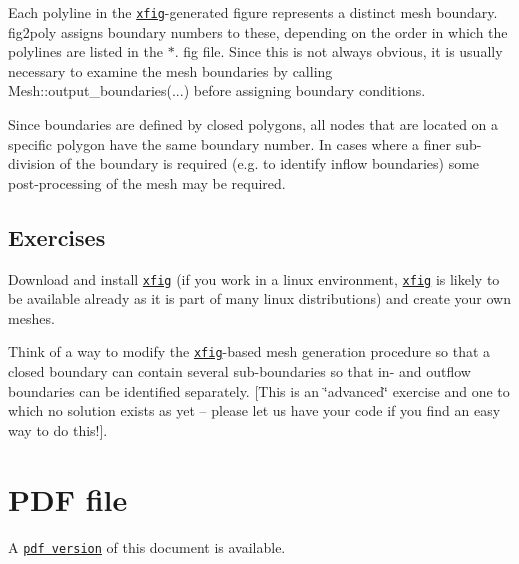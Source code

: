 \begin{DoxyEnumerate}
\item Each polyline in the \href{http://en.wikipedia.org/wiki/Xfig}{\tt xfig}-\/generated figure represents a distinct mesh boundary. {\ttfamily fig2poly} assigns boundary numbers to these, depending on the order in which the polylines are listed in the {\ttfamily $\ast$}. {\ttfamily fig} file. Since this is not always obvious, it is usually necessary to examine the mesh boundaries by calling {\ttfamily Mesh\+::output\+\_\+boundaries}(...) before assigning boundary conditions. ~\newline
~\newline

\item Since boundaries are defined by closed polygons, all nodes that are located on a specific polygon have the same boundary number. In cases where a finer sub-\/division of the boundary is required (e.\+g. to identify inflow boundaries) some post-\/processing of the mesh may be required.
\end{DoxyEnumerate}\hypertarget{index_ex}{}\subsection{Exercises}\label{index_ex}

\begin{DoxyEnumerate}
\item Download and install \href{http://en.wikipedia.org/wiki/Xfig}{\tt xfig} (if you work in a linux environment, \href{http://en.wikipedia.org/wiki/Xfig}{\tt xfig} is likely to be available already as it is part of many linux distributions) and create your own meshes. ~\newline
~\newline

\item Think of a way to modify the \href{http://en.wikipedia.org/wiki/Xfig}{\tt xfig}-\/based mesh generation procedure so that a closed boundary can contain several sub-\/boundaries so that in-\/ and outflow boundaries can be identified separately. \mbox{[}This is an \char`\"{}advanced\char`\"{} exercise and one to which no solution exists as yet -- please let us have your code if you find an easy way to do this!\mbox{]}.
\end{DoxyEnumerate}



 

 \hypertarget{index_pdf}{}\section{P\+D\+F file}\label{index_pdf}
A \href{../latex/refman.pdf}{\tt pdf version} of this document is available. 

